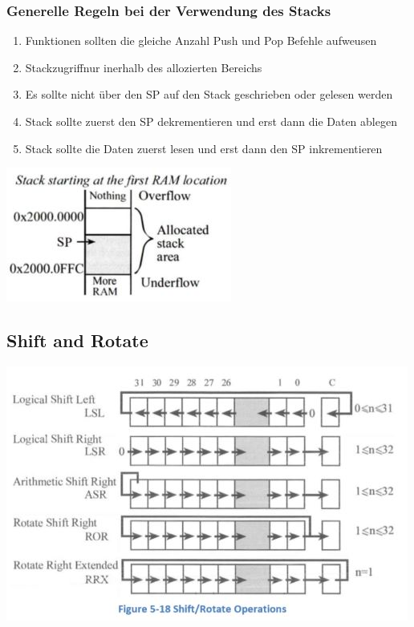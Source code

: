 \subsubsection{Generelle Regeln bei der Verwendung des Stacks}
\begin{multicols}{2}
\begin{enumerate}
    \item Funktionen sollten die gleiche Anzahl Push und Pop Befehle aufweusen
    \item Stackzugriffnur inerhalb des allozierten Bereichs
    \item Es sollte nicht über den SP auf den Stack geschrieben oder gelesen werden
    \item Stack sollte zuerst den SP dekrementieren und erst dann die Daten ablegen
    \item Stack sollte die Daten zuerst lesen und erst dann den SP inkrementieren
\end{enumerate}
    \includegraphics[width=0.8\linewidth]{images/allocatedStack}  
\end{multicols}
\subsection{Shift and Rotate}
\includegraphics[width=0.8\linewidth]{images/shiftandrotate} 